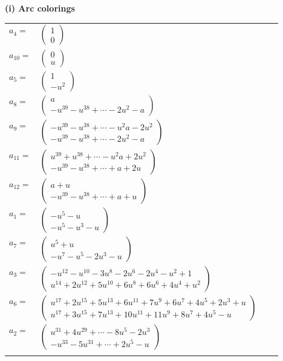 \documentclass[1p]{elsarticle_modified}
\theoremstyle{definition}
\begin{document}
\flushleft \textbf{(i) Arc colorings}\\
\begin{tabular}{m{7pt} m{180pt} m{7pt} m{180pt} }
\flushright $a_{4}=$&$\begin{pmatrix}1\\0\end{pmatrix}$ \\
\flushright $a_{10}=$&$\begin{pmatrix}0\\u\end{pmatrix}$ \\
\flushright $a_{5}=$&$\begin{pmatrix}1\\- u^2\end{pmatrix}$ \\
\flushright $a_{8}=$&$\begin{pmatrix}a\\- u^{39}- u^{38}+\cdots-2 u^2- a\end{pmatrix}$ \\
\flushright $a_{9}=$&$\begin{pmatrix}- u^{39}- u^{38}+\cdots- u^2 a-2 u^2\\- u^{39}- u^{38}+\cdots-2 u^2- a\end{pmatrix}$ \\
\flushright $a_{11}=$&$\begin{pmatrix}u^{39}+u^{38}+\cdots- u^2 a+2 u^2\\- u^{39}- u^{38}+\cdots+a+2 u\end{pmatrix}$ \\
\flushright $a_{12}=$&$\begin{pmatrix}a+u\\- u^{39}- u^{38}+\cdots+a+u\end{pmatrix}$ \\
\flushright $a_{1}=$&$\begin{pmatrix}- u^5- u\\- u^5- u^3- u\end{pmatrix}$ \\
\flushright $a_{7}=$&$\begin{pmatrix}u^5+u\\- u^7- u^5-2 u^3- u\end{pmatrix}$ \\
\flushright $a_{3}=$&$\begin{pmatrix}- u^{12}- u^{10}-3 u^8-2 u^6-2 u^4- u^2+1\\u^{14}+2 u^{12}+5 u^{10}+6 u^8+6 u^6+4 u^4+u^2\end{pmatrix}$ \\
\flushright $a_{6}=$&$\begin{pmatrix}u^{17}+2 u^{15}+5 u^{13}+6 u^{11}+7 u^9+6 u^7+4 u^5+2 u^3+u\\u^{17}+3 u^{15}+7 u^{13}+10 u^{11}+11 u^9+8 u^7+4 u^5- u\end{pmatrix}$ \\
\flushright $a_{2}=$&$\begin{pmatrix}u^{31}+4 u^{29}+\cdots-8 u^5-2 u^3\\- u^{33}-5 u^{31}+\cdots+2 u^5- u\end{pmatrix}$\\&\end{tabular}
\end{document}

